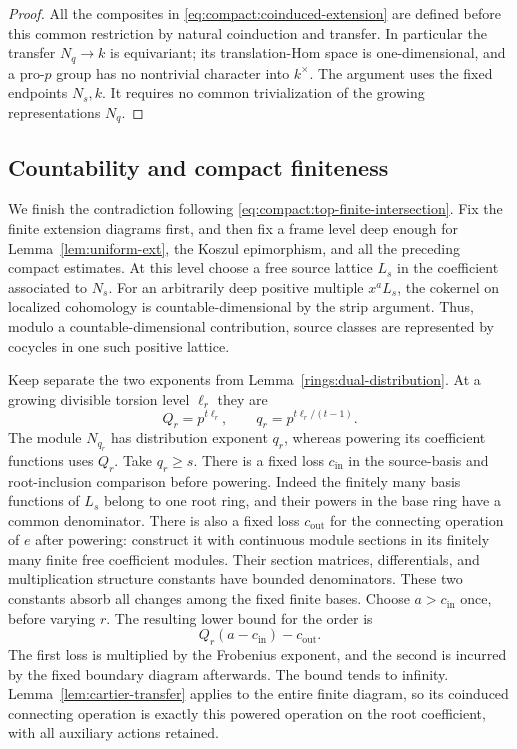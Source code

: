 \begin{proof}
All the composites in \eqref{eq:compact:coinduced-extension} are
defined before this common restriction by natural coinduction and
transfer.  In particular the transfer $N_q\to k$ is equivariant; its
translation-Hom space is one-dimensional, and a pro-$p$ group has no
nontrivial character into $k^\times$.  The argument uses the fixed
endpoints $N_s,k$.  It requires no common trivialization of the
growing representations $N_q$.
\end{proof}

\subsection{Countability and compact finiteness}

We finish the contradiction following
\eqref{eq:compact:top-finite-intersection}. Fix the finite extension
diagrams first, and then fix a frame level deep enough for
Lemma~\ref{lem:uniform-ext}, the Koszul epimorphism, and all the
preceding compact estimates. At this level choose a free source
lattice $L_s$ in the coefficient associated to $N_s$. For an
arbitrarily deep positive multiple $x^aL_s$, the
cokernel on localized cohomology is countable-dimensional by the strip
argument.  Thus, modulo a countable-dimensional contribution, source
classes are represented by cocycles in one such positive lattice.

Keep separate the two exponents from
Lemma~\ref{rings:dual-distribution}. At a growing divisible torsion
level $\ell_r$ they are
\[
 Q_r=p^{t\ell_r},\qquad q_r=p^{t\ell_r/(t-1)}.
\]
The module $N_{q_r}$ has distribution exponent $q_r$, whereas powering
its coefficient functions uses $Q_r$. Take $q_r\geq s$.
There is a fixed loss $c_{\mathrm{in}}$ in the source-basis and
root-inclusion comparison before powering. Indeed the finitely many
basis functions of $L_s$ belong to one root ring, and their powers in
the base ring have a common denominator. There is also a fixed loss
$c_{\mathrm{out}}$ for the connecting operation of $e$ after powering:
construct it with continuous module sections in its finitely many
finite free coefficient modules. Their section matrices,
differentials, and multiplication structure constants have bounded
denominators. These two constants absorb all changes among the fixed
finite bases. Choose $a>c_{\mathrm{in}}$ once, before varying $r$.
The resulting lower bound for the order is
\[
                  Q_r(a-c_{\mathrm{in}})-c_{\mathrm{out}}.
\]
The first loss is multiplied by the Frobenius exponent, and the
second is incurred by the fixed boundary diagram afterwards. The
bound tends to infinity. Lemma~\ref{lem:cartier-transfer} applies to
the entire finite diagram, so its coinduced connecting operation is
exactly this powered operation on the root coefficient, with all
auxiliary actions retained.

